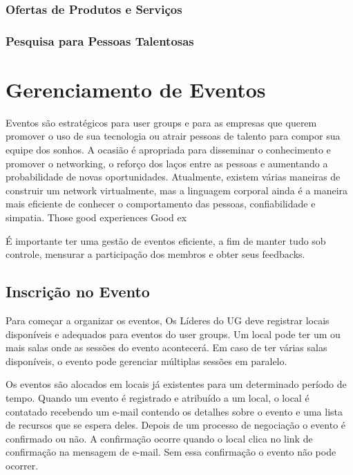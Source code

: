 \documentclass[envcountsame,envcountchap]{svmono}
\begin{document}
\subsection{Ofertas de Produtos e Serviços}

\subsection{Pesquisa para Pessoas Talentosas}

\chapter{Gerenciamento de Eventos}
\label{chp:event-management}

Eventos são estratégicos para user groups e para as empresas que querem promover o uso de sua tecnologia ou atrair pessoas de talento para compor sua equipe dos sonhos. A ocasião é apropriada para disseminar o conhecimento e promover o networking, o reforço dos laços entre as pessoas e aumentando a probabilidade de novas oportunidades. Atualmente, existem várias maneiras de construir um network virtualmente, mas a linguagem corporal ainda é a maneira mais eficiente de conhecer o comportamento das pessoas, confiabilidade e simpatia. Those good experiences Good ex

É importante ter uma gestão de eventos eficiente, a fim de manter tudo sob controle, mensurar a participação dos membros e obter seus feedbacks.

\section{Inscrição no Evento}

Para começar a organizar os eventos, Os Líderes do UG deve registrar locais disponíveis e adequados para eventos do user groups. Um local pode ter um ou mais salas onde as sessões do evento acontecerá. Em caso de ter várias salas disponíveis, o evento pode gerenciar múltiplas sessões em paralelo.

Os eventos são alocados em locais já existentes para um determinado período de tempo. Quando um evento é registrado e atribuído a um local, o local é contatado recebendo um e-mail contendo os detalhes sobre o evento e uma lista de recursos que se espera deles. Depois de um processo de negociação o evento é confirmado ou não. A confirmação ocorre quando o local clica no link de confirmação na mensagem de e-mail. Sem essa confirmação o evento não pode ocorrer.
\end{document}
